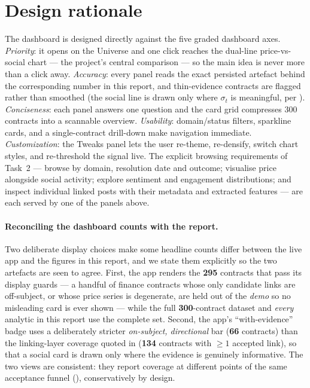 \section{Design rationale}
The dashboard is designed directly against the five graded dashboard axes.
\emph{Priority}: it opens on the Universe and one click reaches the dual-line
price-vs-social chart --- the project's central comparison --- so the main idea is never
more than a click away. \emph{Accuracy}: every panel reads the exact persisted artefact
behind the corresponding number in this report, and thin-evidence contracts are flagged
rather than smoothed (the social line is drawn only where $\sigma_t$ is meaningful, per
). \emph{Conciseness}: each panel answers one question and the card grid
compresses 300 contracts into a scannable overview. \emph{Usability}: domain/status
filters, sparkline cards, and a single-contract drill-down make navigation immediate.
\emph{Customization}: the Tweaks panel lets the user re-theme, re-densify, switch chart
styles, and re-threshold the signal live. The explicit browsing requirements of Task~2
--- browse by domain, resolution date and outcome; visualise price alongside social
activity; explore sentiment and engagement distributions; and inspect individual linked
posts with their metadata and extracted features --- are each served by one of the panels
above.

\paragraph{Reconciling the dashboard counts with the report.} Two deliberate display
choices make some headline counts differ between the live app and the figures in this
report, and we state them explicitly so the two artefacts are seen to agree. First, the
app renders the \textbf{295} contracts that pass its display guards --- a handful of
finance contracts whose only candidate links are off-subject, or whose price series is
degenerate, are held out of the \emph{demo} so no misleading card is ever shown --- while
the full \textbf{300}-contract dataset and \emph{every} analytic in this report use the
complete set. Second, the app's ``with-evidence'' badge uses a deliberately stricter
\emph{on-subject, directional} bar (\textbf{66} contracts) than the linking-layer coverage
quoted in  (\textbf{134} contracts with $\geq\!1$ accepted link), so that
a social card is drawn only where the evidence is genuinely informative. The two views are
consistent: they report coverage at different points of the same acceptance funnel
(), conservatively by design.

